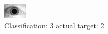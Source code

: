 \begin{figure}[h!]
\begin{center}
\includegraphics[width=0.60\columnwidth]{figures/ID1685_class_3_target_2.png}
\end{center}
\caption{ Classification: 3 actual target: 2}
\label{fig:ID1685_class_3_target_2}
\end{figure}
